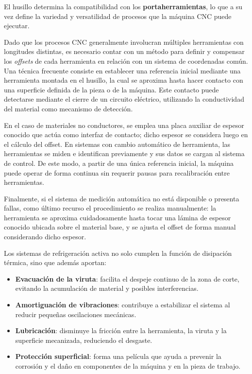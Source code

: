 El husillo determina la compatibilidad con los \textbf{portaherramientas}, lo que a su vez define la variedad y versatilidad de procesos que la máquina CNC puede ejecutar. 

Dado que los procesos CNC generalmente involucran múltiples herramientas con longitudes distintas, es necesario contar con un método para definir y compensar los \textit{offsets} de cada herramienta en relación con un sistema de coordenadas común. Una técnica frecuente consiste en establecer una referencia inicial mediante una herramienta montada en el husillo, la cual se aproxima hasta hacer contacto con una superficie definida de la pieza o de la máquina. Este contacto puede detectarse mediante el cierre de un circuito eléctrico, utilizando la conductividad del material como mecanismo de detección.

En el caso de materiales no conductores, se emplea una placa auxiliar de espesor conocido que actúa como interfaz de contacto; dicho espesor se considera luego en el cálculo del offset. En sistemas con cambio automático de herramienta, las herramientas se miden e identifican previamente y sus datos se cargan al sistema de control. De este modo, a partir de una única referencia inicial, la máquina puede operar de forma continua sin requerir pausas para recalibración entre herramientas.

Finalmente, si el sistema de medición automática no está disponible o presenta fallas, como último recurso el procedimiento se realiza manualmente: la herramienta se aproxima cuidadosamente hasta tocar una lámina de espesor conocido ubicada sobre el material base, y se ajusta el offset de forma manual considerando dicho espesor.

Los sistemas de refrigeración activa no solo cumplen la función de disipación térmica, sino que además aportan:

\begin{itemize}
	\item \textbf{Evacuación de la viruta}: facilita el despeje continuo de la zona de corte, evitando la acumulación de material y posibles interferencias.
	\item \textbf{Amortiguación de vibraciones}: contribuye a estabilizar el sistema al reducir pequeñas oscilaciones mecánicas.
	\item \textbf{Lubricación}: disminuye la fricción entre la herramienta, la viruta y la superficie mecanizada, reduciendo el desgaste.
	\item \textbf{Protección superficial}: forma una película que ayuda a prevenir la corrosión y el daño en componentes de la máquina y en la pieza de trabajo.
\end{itemize}


